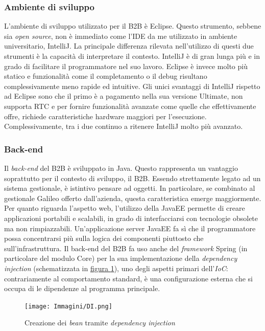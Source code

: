 \subsubsection{Ambiente di sviluppo}
L'ambiente di sviluppo utilizzato per il B2B è Eclipse. Questo strumento, sebbene sia \textit{open source}, non è immediato come l'IDE da me utilizzato in ambiente universitario, IntelliJ. La principale differenza rilevata nell'utilizzo di questi due strumenti è la capacità di interpretare il contesto. IntelliJ è di gran lunga più  e in grado di facilitare il programmatore nel suo lavoro. Eclipse è invece molto più statico e funzionalità come il completamento o il debug risultano complessivamente meno rapide ed intuitive. Gli unici svantaggi di IntelliJ rispetto ad Eclipse sono che il primo è a pagamento nella sua versione Ultimate, non supporta RTC e per fornire funzionalità avanzate come quelle che effettivamente offre, richiede caratteristiche hardware maggiori per l'esecuzione. Complessivamente, tra i due continuo a ritenere IntelliJ molto più avanzato.

\subsubsection{Back-end}
Il \textit{back-end} del B2B è sviluppato in Java. Questo rappresenta un vantaggio soprattutto per il contesto di sviluppo, il B2B. Essendo strettamente legato ad un sistema gestionale, è istintivo pensare ad oggetti. In particolare, se combinato al gestionale Galileo offerto dall'azienda, questa caratteristica emerge maggiormente. Per quanto riguarda l'aspetto web, l'utilizzo della JavaEE permette di creare applicazioni portabili e scalabili, in grado di interfacciarsi con tecnologie obsolete ma non rimpiazzabili. Un'applicazione server JavaEE fa sì che il programmatore possa concentrarsi più sulla logica dei componenti piuttosto che sull'infrastruttura. Il back-end del B2B fa uso anche del \textit{framework} Spring (in particolare del modulo Core) per la sua implementazione della \textit{dependency injection} (schematizzata in \hyperref[fig:di]{figura \ref{fig:di}}), uno degli aspetti primari dell'\textit{\Gls{IoC}}: contrariamente al comportamento standard, è una configurazione esterna che si occupa di  le dipendenze al programma principale.
\begin{figure}
	\centering
	\texttt{[image: Immagini/DI.png]}
	\caption{Creazione dei \textit{bean} tramite \textit{dependency injection}}
	\label{fig:di}
\end{figure}


